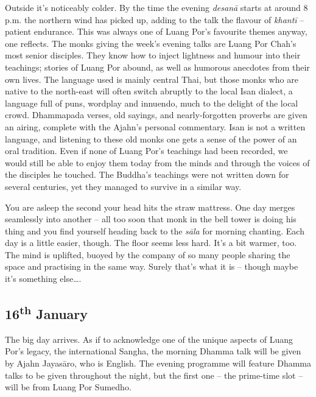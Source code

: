 Outside it's noticeably colder. By the time the evening \emph{desanā}
starts at around 8 p.m. the northern wind has picked up, adding to the
talk the flavour of \emph{khantī} -- patient endurance. This was always
one of Luang Por's favourite themes anyway, one reflects. The monks
giving the week's evening talks are Luang Por Chah's most senior
disciples. They know how to inject lightness and humour into their
teachings; stories of Luang Por abound, as well as humorous anecdotes
from their own lives. The language used is mainly central Thai, but
those monks who are native to the north-east will often switch abruptly
to the local Isan dialect, a language full of puns, wordplay and
innuendo, much to the delight of the local crowd. Dhammapada verses, old
sayings, and nearly-forgotten proverbs are given an airing, complete
with the Ajahn's personal commentary. Isan is not a written language, 
and listening to these old monks one gets a sense of the power of an
oral tradition. Even if none of Luang Por's teachings had been recorded, 
we would still be able to enjoy them today from the minds and through
the voices of the disciples he touched. The Buddha's teachings were not
written down for several centuries, yet they managed to survive in a
similar way. 

You are asleep the second your head hits the straw mattress. One day
merges seamlessly into another -- all too soon that monk in the bell
tower is doing his thing and you find yourself heading back to the
\emph{sāla} for morning chanting. Each day is a little easier, though. 
The floor seems less hard. It's a bit warmer, too. The mind is uplifted, 
buoyed by the company of so many people sharing the space and practising
in the same way. Surely that's what it is -- though maybe it's something
else\ldots{}. 

\subsection*{16\textsuperscript{th} January}

The big day arrives. As if to acknowledge one of
the unique aspects of Luang Por's legacy, the international Sangha, the
morning Dhamma talk will be given by Ajahn Jayasāro, who is English. The
evening programme will feature Dhamma talks to be given throughout the
night, but the first one -- the prime-time slot -- will be from Luang
Por Sumedho. 

